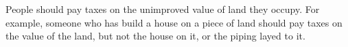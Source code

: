 People should pay taxes on the unimproved value of land they occupy.
For example, someone who has build a house on a piece of land should pay taxes on the value of the land, but not the house on it, or the piping layed to it.